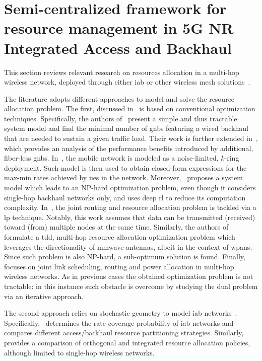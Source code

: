 
\section{Semi-centralized framework for resource management in 5G NR Integrated Access and Backhaul}
This section reviews relevant research on resources allocation in a multi-hop wireless network, deployed through either \gls{iab} or other wireless mesh solutions~\cite{gambiroza2004end}.

The literature adopts different approaches to model and solve the resource allocation problem. The first, discussed in~\cite{qualcomm1, qualcomm2, kulkarni2018max, lei2020deep, rasekh2015interference, bilal2014time, cruz2003optimal} is based on conventional optimization techniques.
Specifically, the authors of~\cite{qualcomm1} present a simple and thus tractable system model and find the minimal number of \glspl{gnb} featuring a wired backhaul that are needed to sustain a given traffic load. Their work is further extended in~\cite{qualcomm2}, which provides an analysis of the performance benefits introduced by additional, fiber-less \glspl{gnb}. 
In~\cite{kulkarni2018max}, the mobile network is modeled as a noise-limited, $k$-ring deployment. Such model is then used to obtain closed-form expressions for the max-min rates achieved by \glspl{ue} in the network. Moreover,~\cite{lei2020deep} proposes a system model which leads to an NP-hard optimization problem, even though it considers single-hop backhaul networks only, and uses deep \gls{rl} to reduce its computation complexity. In~\cite{rasekh2015interference}, the joint routing and resource allocation problem is tackled via a \gls{lp} technique. Notably, this work assumes that data can be transmitted (received) toward (from) multiple nodes at the same time.
Similarly, the authors of~\cite{bilal2014time} formulate a \gls{tdd}, multi-hop resource allocation optimization problem which leverages the directionality of \gls{mmwave} antennas, albeit in the context of \gls{wpans}. Since such problem is also NP-hard, a sub-optimum solution is found. Finally,~\cite{cruz2003optimal} focuses on joint link scheduling, routing and power allocation in multi-hop wireless networks. As in previous cases the obtained optimization problem is not tractable: in this instance such obstacle is overcome by studying the dual problem via an iterative approach.

The second approach relies on stochastic geometry to model \gls{iab} networks~\cite{stoch_geom1, stoch_geom2}. Specifically,~\cite{stoch_geom1} determines the rate coverage probability of \gls{iab} networks and compares different access/backhaul resource partitioning strategies. Similarly,~\cite{stoch_geom2} provides a comparison of orthogonal and integrated resource allocation policies, although limited to single-hop wireless networks.  

